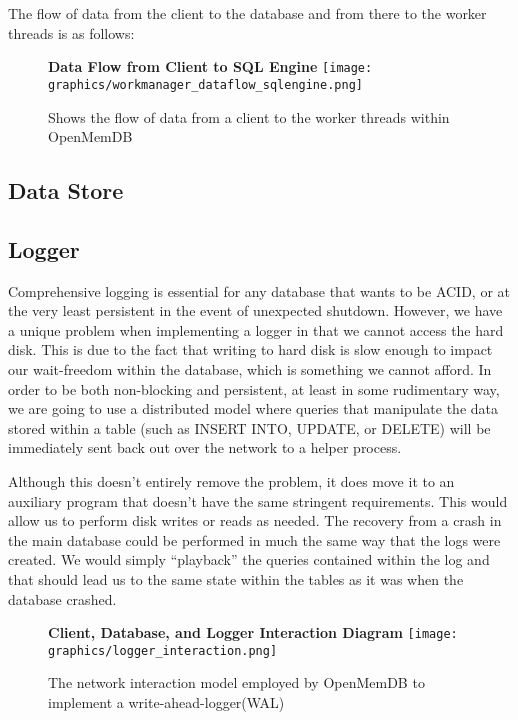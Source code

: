 \documentclass[letterpaper, 12pt]{article}
\begin{document}
  The flow of data from the client to the database and from there to the worker threads
  is as follows:
  \begin{figure}
   \centering
   \textbf{Data Flow from Client to SQL Engine}
   \texttt{[image: graphics/workmanager\_dataflow\_sqlengine.png]}
   \caption{Shows the flow of data from a client to the worker threads within OpenMemDB}
  \end{figure}
  
  \subsection{Data Store}
  
  \subsection{Logger}
  Comprehensive logging is essential for any database that wants to be ACID, or
  at the very least persistent in the event of unexpected shutdown. However, we
  have a unique problem when implementing a logger in that we cannot access the
  hard disk. This is due to the fact that writing to hard disk is slow enough to 
  impact our wait-freedom within the database, which is something we cannot afford.
  In order to be both non-blocking and persistent, at least in some rudimentary way, 
  we are going to use a distributed model where queries that manipulate the data
  stored within a table (such as INSERT INTO, UPDATE, or DELETE) will be immediately
  sent back out over the network to a helper process.
  \par\vspace{\baselineskip}
  Although this doesn't entirely remove the problem, it does move it to an auxiliary
  program that doesn't have the same stringent requirements. This would allow us to 
  perform disk writes or reads as needed. The recovery from a crash in the main database
  could be performed in much the same way that the logs were created. We would simply 
  ``playback'' the queries contained within the log and that should lead us to the same 
  state within the tables as it was when the database crashed.
  \begin{figure}
    \centering
    \textbf{Client, Database, and Logger Interaction Diagram}
    \texttt{[image: graphics/logger\_interaction.png]}
    \caption{The network interaction model employed by OpenMemDB to implement a 
	     write-ahead-logger(WAL)}
  \end{figure}
\end{document}

